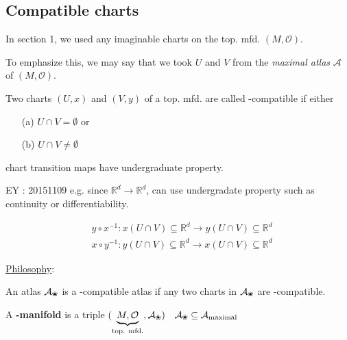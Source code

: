 \subsection{Compatible charts}

In section 1, we used any imaginable charts on the top. mfd. $(M,\mathcal{O})$.  

To emphasize this, we may say that we took $U$ and $V$ from the \emph{maximal atlas} $\mathcal{A}$ of $(M,\mathcal{O})$.  


\begin{definition}
Two charts $(U,x)$ and $(V,y)$ of a top. mfd. are called -compatible if 
either
\begin{enumerate}
  \item[(a)] $U \cap V = \emptyset$
or  \item[(b)] $U\cap V \neq \emptyset$
\end{enumerate}
chart transition maps have undergraduate  property.

EY : 20151109 e.g. since $\mathbb{R}^d \to \mathbb{R}^d$, can use undergradate  property such as continuity or differentiability.

\[
\begin{aligned}
  & y \circ x^{-1} : x(U \cap V) \subseteq \mathbb{R}^d  \to y(U\cap V) \subseteq \mathbb{R}^d  \\
  & x\circ y^{-1} : y(U\cap V) \subseteq \mathbb{R}^d   \to x(U\cap V) \subseteq \mathbb{R}^d
\end{aligned}
\]
\end{definition}

\underline{Philosophy}: 

\begin{definition}
  An atlas $\mathcal{A}_{\text{\ding{96}}}$ is a -compatible atlas if any two charts in $\mathcal{A}_{\text{\ding{96}}}$ are -compatible.

\end{definition}

\begin{definition}
  A \textbf{-manifold} is a triple $(\underbrace{ M,\mathcal{O} }_{\text{top. mfd.} }, \mathcal{A}_{\text{\ding{96}}})$ \quad \, $\mathcal{A}_{\text{\ding{96}}} \subseteq \mathcal{A}_{\text{maximal}} $
\end{definition}


